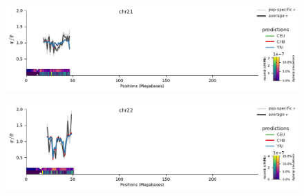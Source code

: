 \documentclass[11pt]{article}
\begin{document}
\begin{figure}[!htb]
  \centering
  \includegraphics[width=\textwidth]{figures/supplementary/pred_plot_chr21.pdf}
  \label{suppfig:fit-chr21}
\end{figure}


\begin{figure}[!htb]
  \centering
  \includegraphics[width=\textwidth]{figures/supplementary/pred_plot_chr22.pdf}
  \label{suppfig:fit-chr22}
\end{figure}

\clearpage

%
%
%
%
%
%
%
%
%
\printbibliography
\end{document}
